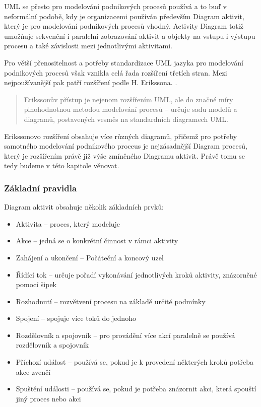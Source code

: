 \documentclass[]{article}
\begin{document}
UML se přesto pro modelování podnikových procesů používá a to buď v neformální podobě, kdy je organizacemi používán především Diagram aktivit, který je pro modelování podnikových procesů vhodný. Activity Diagram totiž umožňuje sekvenční i paralelní zobrazování aktivit a objekty na vstupu i výstupu procesu a také závislosti mezi jednotlivými aktivitami.

Pro větší přenositelnost a potřeby standardizace UML jazyka pro modelování podnikových procesů však vznikla celá řada rozšíření třetích stran. Mezi nejpoužívanější pak patří rozšíření podle H. Erikssona. \cite{Repa2007,Eriksson2000}. 

\begin{quote}
Erikssonův přístup je nejenom rozšířením UML, ale do značné míry plnohodnotnou metodou modelování procesů – určuje sadu modelů a diagramů, postavených vesměs na standardních diagramech UML. \cite{Repa2007}
\end{quote}

Erikssonovo rozšíření obsahuje více různých diagramů, přičemž pro potřeby samotného modelování podnikového proceus je nejzásadnější Diagram procesů, který je rozšířením právě již výše zmíněného Diagramu aktivit. Právě tomu se tedy budeme v této kapitole věnovat.

\subsubsection{Základní pravidla}
Diagram aktivit obsahuje několik základních prvků: \cite{UMLActivity}

\begin{itemize}
\item Aktivita – proces, který modeluje
\item Akce – jedná se o konkrétní činnost v rámci aktivity
\item Zahájení a ukončení – Počáteční a koncový uzel
\item Řídící tok – určuje pořadí vykonávání jednotlivých kroků aktivity, znázorněné pomocí šipek
\item Rozhodnutí – rozvětvení procesu na základě určité podmínky
\item Spojení – spojuje více toků do jednoho
\item Rozdělovník a spojovník – pro provádění více akcí paralelně se používá rozdělovník a spojovník
\item Příchozí událost – používá se, pokud je k provedení některých kroků potřeba akce zvenčí
\item Spuštění události – používá se, pokud je potřeba znázornit akci, která spouští jiný proces nebo akci
\end{itemize}
\end{document}
